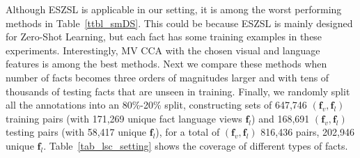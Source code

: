\documentclass[runningheads]{llncs}
\begin{document}
Although ESZSL is applicable in our setting, it is among the worst performing methods in Table~\ref{ttbl_smDS}.
This could be because ESZSL is mainly designed for Zero-Shot Learning, but each fact has some training examples in these experiments. Interestingly, MV CCA with the chosen visual and language features is among the best methods.  Next we compare these methods when number of facts becomes three orders of magnitudes larger and with tens of thousands of testing facts that are unseen in training.%
Finally, we randomly split all the annotations into an 80\%-20\% split, constructing sets of 647,746 $(\mathbf{f}_v, \mathbf{f}_l)$ training pairs (with 171,269 unique fact language views $\mathbf{f}_l$) and 168,691 $(\mathbf{f}_v, \mathbf{f}_l)$ testing pairs (with 58,417 unique $\mathbf{f}_l$), for a total of $(\mathbf{f}_v, \mathbf{f}_l)$ 816,436 pairs, 202,946 unique  $\mathbf{f}_l$. Table~\ref{tab_lsc_setting} shows the coverage of  different types of facts. %
\end{document}
